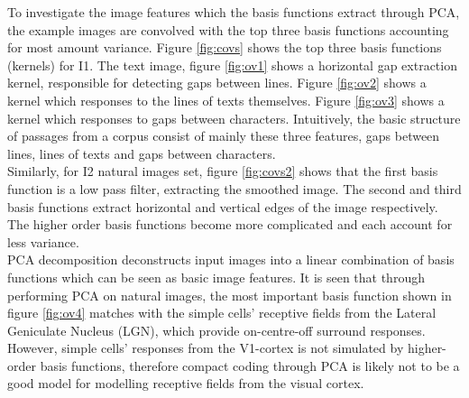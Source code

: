 \documentclass[journal]{IEEEtran}
\begin{document}
To investigate the image features which the basis functions extract through PCA, the example images are convolved with the top three basis functions accounting for most amount variance. Figure \ref{fig:covs} shows the top three basis functions (kernels) for I1. The text image, figure \ref{fig:ov1} shows a horizontal gap extraction kernel, responsible for detecting gaps between lines. Figure \ref{fig:ov2} shows a kernel which responses to the lines of texts themselves. Figure \ref{fig:ov3} shows a kernel which responses to gaps between characters. Intuitively, the basic structure of passages from a corpus consist of mainly these three features, gaps between lines, lines of texts and gaps between characters. \\
Similarly, for I2 natural images set, figure \ref{fig:covs2} shows that the first basis function is a low pass filter, extracting the smoothed image. The second and third basis functions extract horizontal and vertical edges of the image respectively. The higher order basis functions become more complicated and each account for less variance.\\
PCA decomposition deconstructs input images into a linear combination of basis functions which can be seen as basic image features. It is seen that through performing PCA on natural images, the most important basis function shown in figure \ref{fig:ov4} matches with the simple cells' receptive fields from the Lateral Geniculate Nucleus (LGN), which provide on-centre-off surround responses. However, simple cells' responses from the V1-cortex is not simulated by higher-order basis functions, therefore compact coding through PCA is likely not to be a good model for modelling receptive fields from the visual cortex.
\end{document}
